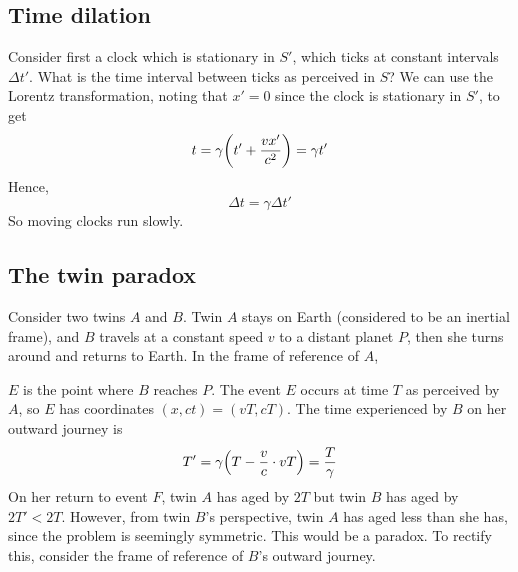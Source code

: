 \subsection{Time dilation}
Consider first a clock which is stationary in \(S'\), which ticks at constant intervals \(\Delta t'\).
What is the time interval between ticks as perceived in \(S\)?
We can use the Lorentz transformation, noting that \(x'=0\) since the clock is stationary in \(S'\), to get
\[
	t = \gamma\qty(t' + \frac{vx'}{c^2}) = \gamma t'
\]
Hence,
\[
	\Delta t = \gamma \Delta t'
\]
So moving clocks run slowly.

\subsection{The twin paradox}
Consider two twins \(A\) and \(B\).
Twin \(A\) stays on Earth (considered to be an inertial frame), and \(B\) travels at a constant speed \(v\) to a distant planet \(P\), then she turns around and returns to Earth.
In the frame of reference of \(A\),
\begin{center}
\end{center}
\(E\) is the point where \(B\) reaches \(P\).
The event \(E\) occurs at time \(T\) as perceived by \(A\), so \(E\) has coordinates \((x, ct) = (vT, cT)\).
The time experienced by \(B\) on her outward journey is
\[
	T' = \gamma\qty(T - \frac{v}{c}\cdot vT) = \frac{T}{\gamma}
\]
On her return to event \(F\), twin \(A\) has aged by \(2T\) but twin \(B\) has aged by \(2T' < 2T\).
However, from twin \(B\)'s perspective, twin \(A\) has aged less than she has, since the problem is seemingly symmetric.
This would be a paradox.
To rectify this, consider the frame of reference of \(B\)'s outward journey.
